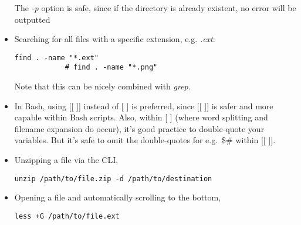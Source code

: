 \documentclass[12pt, a4paper]{article}
\numberwithin{equation}{section}
\theoremstyle{definition}
\theoremstyle{definition}
\begin{document}
\begin{itemize}
		The \textit{-p} option is safe, since if the directory is already existent, no error will be outputted
		
		\item Searching for all files with a specific extension, e.g. \textit{.ext}: 
		
		\begin{lstlisting}[style=mystylebash, label=alg:bash_find, xleftmargin=\parindent]
			find . -name "*.ext"
			# find . -name "*.png"
		\end{lstlisting}
		
		Note that this can be nicely combined with \textit{grep}.
		
		\item In Bash, using [[ ]] instead of [ ] is preferred, since [[ ]]  is safer and more capable within Bash scripts. Also, within [ ] (where word splitting and filename expansion do occur), it's good practice to double-quote your variables. But it's safe to omit the double-quotes for e.g.~\$\# within [[ ]].
		
		\item Unzipping a file via the CLI, 
		
		\begin{lstlisting}[style=mystylebash, label=alg:bash_unzip, xleftmargin=\parindent]
			unzip /path/to/file.zip -d /path/to/destination
		\end{lstlisting}
		
		\item Opening a file and automatically scrolling to the bottom,
		
		\begin{lstlisting}[style=mystylebash, label=alg:less__bottom_scroll, xleftmargin=\parindent]
			less +G /path/to/file.ext
		\end{lstlisting}
		
	\end{itemize}
	
	\newpage 
\end{document}
